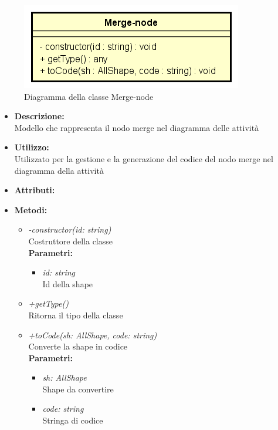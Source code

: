 \begin{figure}[h!]
	\centering
	\includegraphics[scale=0.8]{res/sections/SpecificaFrontEnd/Services/Disegnetti/merge-node.png}
	\caption{Diagramma della classe Merge-node}
\end{figure}

\begin{itemize}
	\item \textbf{Descrizione:}\\
	Modello che rappresenta il nodo merge nel diagramma delle attività
	\item \textbf{Utilizzo:}\\
	Utilizzato per la gestione e la generazione del codice del nodo merge nel diagramma della attività
	\item \textbf{Attributi:}
	\item \textbf{Metodi:}
		\begin{itemize}
			\item \emph{-constructor(id: string)}\\
    		Costruttore della classe\\
    		\textbf{Parametri:}
    		\begin{itemize}
    			\item \emph{id: string}\\
    			Id della shape
    		\end{itemize}
    		\item \emph{+getType()}\\
    		Ritorna il tipo della classe
    		\item \emph{+toCode(sh: AllShape, code: string)}\\
    		Converte la shape in codice\\
    		\textbf{Parametri:}
    		\begin{itemize}
    			\item \emph{sh: AllShape}\\
    			Shape da convertire
    			\item \emph{code: string}\\
    			Stringa di codice
    		\end{itemize}
    	\end{itemize}
\end{itemize}